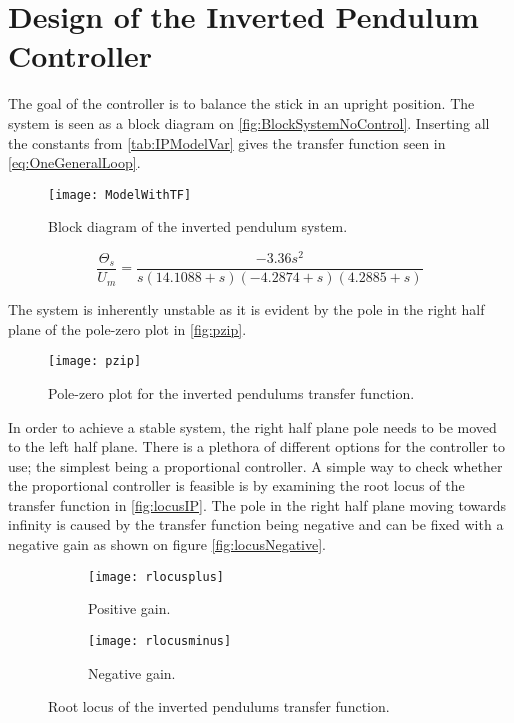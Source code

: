 \graphicspath{{figures/Design/IPController/}}
\chapter{Design of the Inverted Pendulum Controller}\label{sec:IPController}

The goal of the controller is to balance the stick in an upright position. The system is seen as a block diagram on \autoref{fig:BlockSystemNoControl}. Inserting all the constants from \autoref{tab:IPModelVar} gives the transfer function seen in \autoref{eq:OneGeneralLoop}.
\begin{figure}[htbp]
\centering
\texttt{[image: ModelWithTF]}
\caption{Block diagram of the inverted pendulum system.}
\label{fig:BlockSystemNoControl}
\end{figure}

\begin{equation}\label{eq:OneGeneralLoop}
\frac{\Theta_s}{U_m}=\frac{-3.36 s^2}{s (14.1088+s)(-4.2874+s)(4.2885+s)} %
\end{equation}

The system is inherently unstable as it is evident by the pole in the right half plane of the pole-zero plot in \autoref{fig:pzip}.
\begin{figure}[htbp]
\centering
\texttt{[image: pzip]}
\caption{Pole-zero plot for the inverted pendulums transfer function.}
\label{fig:pzip}
\end{figure}

In order to achieve a stable system, the right half plane pole needs to be moved to the left half plane.
\newpage
There is a plethora of different options for the controller to use; the simplest being a proportional controller. A simple way to check whether the proportional controller is feasible is by examining the root locus of the transfer function in \autoref{fig:locusIP}. The pole in the right half plane moving towards infinity is caused by the transfer function being negative and can be fixed with a negative gain as shown on figure \autoref{fig:locusNegative}.
\begin{figure}[htbp]
\centering
	\begin{subfigure}{0.45\textwidth}
	\texttt{[image: rlocusplus]}
	\caption{Positive gain.}
	\label{fig:locusIP}
	\end{subfigure}
	\begin{subfigure}{0.45\textwidth}
	\centering
	\texttt{[image: rlocusminus]}
	\caption{Negative gain.}
	\label{fig:locusNegative}
	\end{subfigure}
\caption{Root locus of the inverted pendulums transfer function.}
\end{figure}

